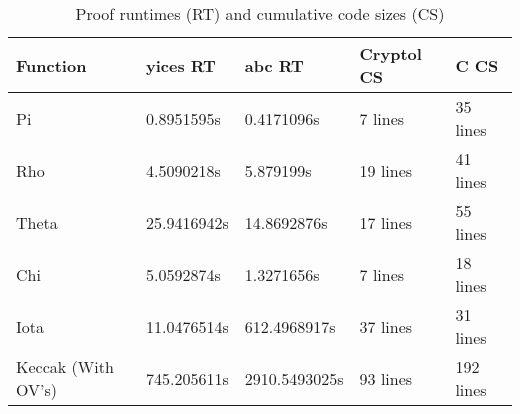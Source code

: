 \begin{table}[t]
  \caption{Proof runtimes (RT) and cumulative code sizes (CS)}\label{statsTable}
  \setlength{\tabcolsep}{6.5pt}
  \begin{tabular}{|l|l|l|l|l|}
  \hline
  \textbf{Function} & \textbf{yices RT} & \textbf{abc RT} & \textbf{Cryptol CS} & \textbf{C CS} \\
  \hline
  Pi & 	0.8951595s & 0.4171096s & 7 lines & 35 lines \\
  Rho & 4.5090218s & 5.879199s & 19 lines & 41 lines \\
  Theta & 25.9416942s & 14.8692876s & 17 lines & 55 lines \\
  Chi & 5.0592874s & 1.3271656s & 7 lines & 18 lines \\
  Iota & 11.0476514s & 612.4968917s & 37 lines & 31 lines \\
  Keccak (With OV's) & 745.205611s &	2910.5493025s & 93 lines & 192 lines \\
  \hline
  \end{tabular}
  \end{table}